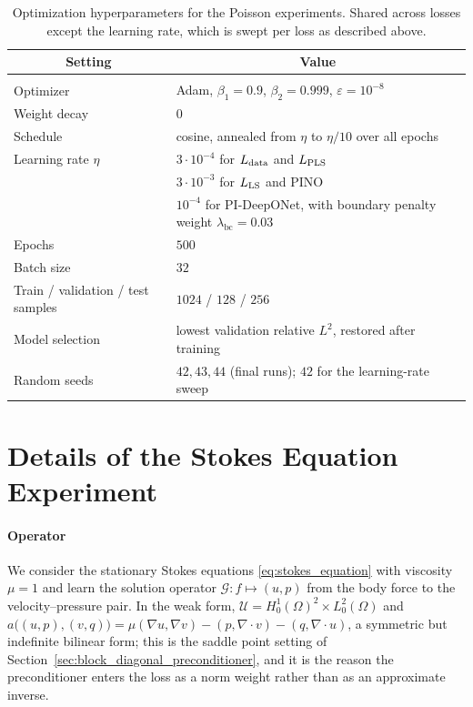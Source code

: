 \documentclass{article} %
\begin{document}
\begin{table}[htb]
   \caption{Optimization hyperparameters for the Poisson experiments. Shared across losses except
   the learning rate, which is swept per loss as described above.}
   \label{tab:optim}
   \begin{center}
   \begin{tabular}{ll}
      \multicolumn{1}{c}{\bf Setting} & \multicolumn{1}{c}{\bf Value} \\ \hline \\
      Optimizer                 & Adam, $\beta_1 = 0.9$, $\beta_2 = 0.999$, $\varepsilon = 10^{-8}$ \\
      Weight decay              & $0$ \\
      Schedule                  & cosine, annealed from $\eta$ to $\eta/10$ over all epochs \\
      Learning rate $\eta$      & $3\cdot 10^{-4}$ for $L_\textup{data}$ and $L_\textup{PLS}$ \\
                                & $3\cdot 10^{-3}$ for $L_\textup{LS}$ and PINO \\
                                & $10^{-4}$ for PI-DeepONet, with boundary penalty weight $\lambda_{\mathrm{bc}} = 0.03$ \\
      Epochs                    & $500$ \\
      Batch size                & $32$ \\
      Train / validation / test samples & $1024$ / $128$ / $256$ \\
      Model selection           & lowest validation relative $L^2$, restored after training \\
      Random seeds              & $42, 43, 44$ (final runs); $42$ for the learning-rate sweep \\
   \end{tabular}
   \end{center}
\end{table}

\section{Details of the Stokes Equation Experiment}\label{appendix:details_stokes}

\paragraph{Operator} We consider the stationary Stokes equations \eqref{eq:stokes_equation} with viscosity $\mu = 1$ and learn the solution operator $\mathcal G: f \mapsto (u, p)$ from the body force to the velocity--pressure pair. In the weak form, $\mathcal U = H^1_0(\Omega)^2 \times L^2_0(\Omega)$ and $a\big((u,p),(v,q)\big) = \mu(\nabla u, \nabla v) - (p, \nabla\cdot v) - (q, \nabla\cdot u)$, a symmetric but indefinite bilinear form; this is the saddle point setting of Section~\ref{sec:block_diagonal_preconditioner}, and it is the reason the preconditioner enters the loss as a norm weight rather than as an approximate inverse.
\end{document}
